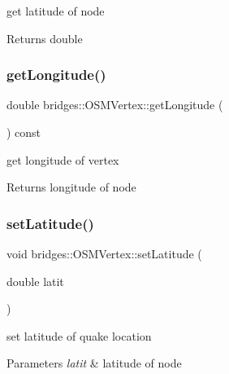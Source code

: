 get latitude of node

\begin{DoxyReturn}{Returns}
double 
\end{DoxyReturn}
\mbox{\label{classbridges_1_1_o_s_m_vertex_a90d51ece713519a272e4224171b30b34}} 
\subsubsection{\texorpdfstring{getLongitude()}{getLongitude()}}
{\footnotesize\ttfamily double bridges\+::\+O\+S\+M\+Vertex\+::get\+Longitude (\begin{DoxyParamCaption}{ }\end{DoxyParamCaption}) const\hspace{0.3cm}{\ttfamily [inline]}}

get longitude of vertex

\begin{DoxyReturn}{Returns}
longitude of node 
\end{DoxyReturn}
\mbox{\label{classbridges_1_1_o_s_m_vertex_a8011165f0932b3b69cf303b41b2d55a1}} 
\subsubsection{\texorpdfstring{setLatitude()}{setLatitude()}}
{\footnotesize\ttfamily void bridges\+::\+O\+S\+M\+Vertex\+::set\+Latitude (\begin{DoxyParamCaption}\item[{double}]{latit }\end{DoxyParamCaption})\hspace{0.3cm}{\ttfamily [inline]}}

set latitude of quake location


\begin{DoxyParams}{Parameters}
{\em latit} & latitude of node \\
\hline
\end{DoxyParams}
\mbox{\label{classbridges_1_1_o_s_m_vertex_a80cdc32c79a8f2e5c962be3856b75229}} 
